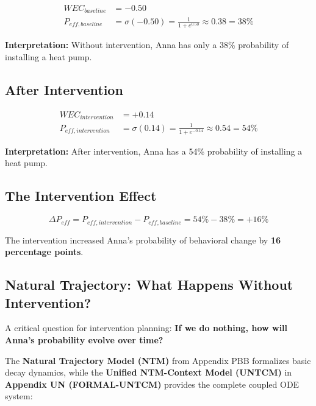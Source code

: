 \begin{align}
WEC_{baseline} &= -0.50 \\
P_{eff,baseline} &= \sigma(-0.50) = \frac{1}{1 + e^{0.50}} \approx 0.38 = 38\%
\end{align}

\textbf{Interpretation:} Without intervention, Anna has only a 38\% probability 
of installing a heat pump.

\subsection{After Intervention}

\begin{align}
WEC_{intervention} &= +0.14 \\
P_{eff,intervention} &= \sigma(0.14) = \frac{1}{1 + e^{-0.14}} \approx 0.54 = 54\%
\end{align}

\textbf{Interpretation:} After intervention, Anna has a 54\% probability 
of installing a heat pump.

\subsection{The Intervention Effect}

\begin{equation}
\Delta P_{eff} = P_{eff,intervention} - P_{eff,baseline} = 54\% - 38\% = +16\%
\end{equation}

The intervention increased Anna's probability of behavioral change by
\textbf{16 percentage points}.

\subsection{Natural Trajectory: What Happens Without Intervention?}
\label{sec:ch16-ntm}

A critical question for intervention planning: \textbf{If we do nothing, how will Anna's probability evolve over time?}

The \textbf{Natural Trajectory Model (NTM)} from Appendix PBB formalizes basic decay dynamics, while the \textbf{Unified NTM-Context Model (UNTCM)} in \textbf{Appendix UN (FORMAL-UNTCM)} provides the complete coupled ODE system:

